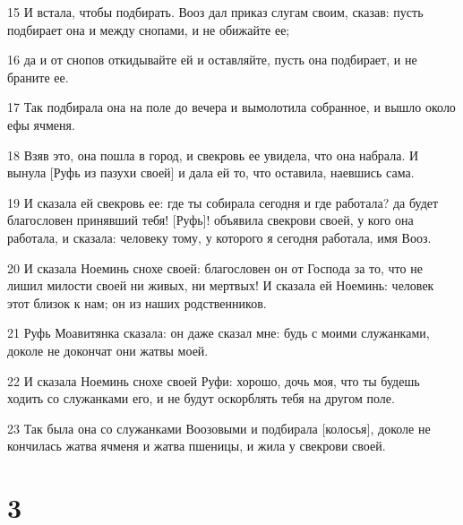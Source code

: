 \par 15 И встала, чтобы подбирать. Вооз дал приказ слугам своим, сказав: пусть подбирает она и между снопами, и не обижайте ее;
\par 16 да и от снопов откидывайте ей и оставляйте, пусть она подбирает, и не браните ее.
\par 17 Так подбирала она на поле до вечера и вымолотила собранное, и вышло около ефы ячменя.
\par 18 Взяв это, она пошла в город, и свекровь ее увидела, что она набрала. И вынула [Руфь из пазухи своей] и дала ей то, что оставила, наевшись сама.
\par 19 И сказала ей свекровь ее: где ты собирала сегодня и где работала? да будет благословен принявший тебя! [Руфь]! объявила свекрови своей, у кого она работала, и сказала: человеку тому, у которого я сегодня работала, имя Вооз.
\par 20 И сказала Ноеминь снохе своей: благословен он от Господа за то, что не лишил милости своей ни живых, ни мертвых! И сказала ей Ноеминь: человек этот близок к нам; он из наших родственников.
\par 21 Руфь Моавитянка сказала: он даже сказал мне: будь с моими служанками, доколе не докончат они жатвы моей.
\par 22 И сказала Ноеминь снохе своей Руфи: хорошо, дочь моя, что ты будешь ходить со служанками его, и не будут оскорблять тебя на другом поле.
\par 23 Так была она со служанками Воозовыми и подбирала [колосья], доколе не кончилась жатва ячменя и жатва пшеницы, и жила у свекрови своей.

\chapter{3}

